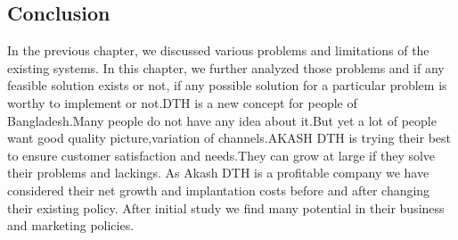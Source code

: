 \begin{spacing}{1.0}
\section{Conclusion}
In the previous chapter, we discussed various problems and limitations of the existing systems. In this chapter, we further analyzed those problems and if any feasible solution exists or not, if any possible solution for a particular problem is worthy to implement or not.DTH is a new concept for people of Bangladesh.Many people do not have any idea about it.But yet a lot of people want good quality picture,variation of channels.AKASH DTH is trying their best to ensure customer satisfaction and needs.They can grow at large if they solve their problems and lackings. As Akash DTH is a profitable company we have considered their net growth and implantation costs before and after changing their existing policy. After initial study we find many potential in their business and marketing policies.  
\end{spacing}